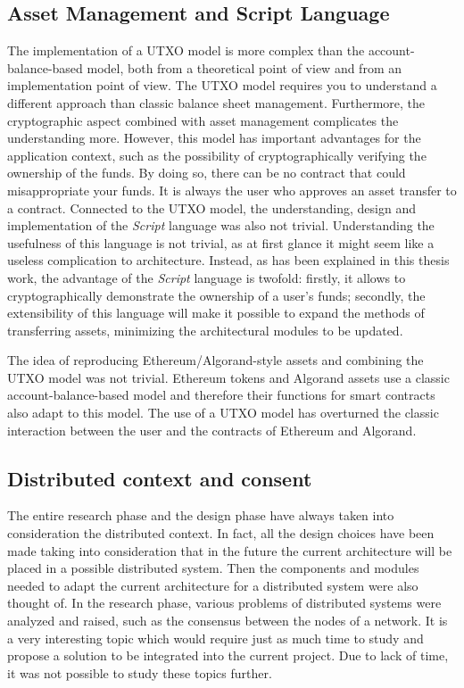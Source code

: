 \subsection{Asset Management and Script Language}

The implementation of a UTXO model is more complex than the account-balance-based model, both from a 
theoretical point of view and from an implementation point of view. The UTXO model requires you to 
understand a different approach than classic balance sheet management. Furthermore, the cryptographic 
aspect combined with asset management complicates the understanding more. However, this model has important 
advantages for the application context, such as the possibility of cryptographically verifying the 
ownership of the funds. By doing so, there can be no contract that could misappropriate your funds. It is 
always the user who approves an asset transfer to a contract. Connected to the UTXO model, the 
understanding, design and implementation of the \textit{Script} language was also not trivial. 
Understanding the usefulness of this language is not trivial, as at first glance it might seem like a 
useless complication to architecture. Instead, as has been explained in this thesis work, the advantage of 
the \textit{Script} language is twofold: firstly, it allows to cryptographically demonstrate the ownership 
of a user's funds; secondly, the extensibility of this language will make it possible to expand the 
methods of transferring assets, minimizing the architectural modules to be updated.

The idea of reproducing Ethereum/Algorand-style assets and combining the UTXO model was not trivial. 
Ethereum tokens and Algorand assets use a classic account-balance-based model and therefore their 
functions for smart contracts also adapt to this model. The use of a UTXO model has overturned the 
classic interaction between the user and the contracts of Ethereum and Algorand.

\subsection{Distributed context and consent}

The entire research phase and the design phase have always taken into consideration the distributed 
context. In fact, all the design choices have been made taking into consideration that in the future the 
current architecture will be placed in a possible distributed system. Then the components and modules 
needed to adapt the current architecture for a distributed system were also thought of. In the research 
phase, various problems of distributed systems were analyzed and raised, such as the consensus between 
the nodes of a network. It is a very interesting topic which would require just as much time to study and 
propose a solution to be integrated into the current project. Due to lack of time, it was not possible to 
study these topics further.

